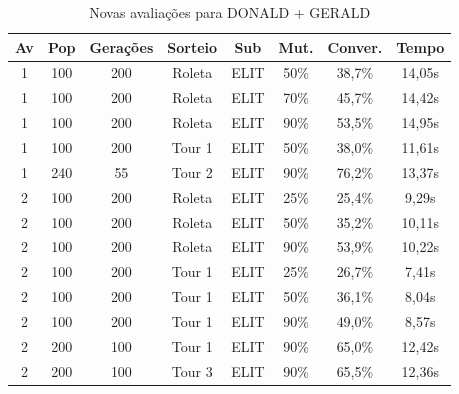 \documentclass[a4paper, 12pt]{article}
\begin{document}
  \begin{table}[h]
    \centering
    \begin{tabular}{|c|c|c|c|c|c|c|c|}
      \hline
      Av & Pop & Gerações & Sorteio & Sub & Mut. & Conver. & Tempo  \\
      \hline
      1 & 100 & 200 & Roleta & ELIT & 50\% &38,7\% & 14,05s\\
      \hline
      1 & 100 & 200 & Roleta & ELIT & 70\% &45,7\% & 14,42s\\
      \hline
      1 & 100 & 200 & Roleta & ELIT & 90\% &53,5\% & 14,95s\\
      \hline
      1 & 100 & 200 & Tour 1 & ELIT & 50\% &38,0\% & 11,61s\\
      \hline
      1 & 240 & 55 & Tour 2 & ELIT & 90\% &76,2\% & 13,37s\\
      \hline
      2 & 100 & 200 & Roleta & ELIT & 25\% &25,4\% & 9,29s\\
      \hline
      2 & 100 & 200 & Roleta & ELIT & 50\% &35,2\% & 10,11s\\
      \hline
      2 & 100 & 200 & Roleta & ELIT & 90\% &53,9\% & 10,22s\\
      \hline
      2 & 100 & 200 & Tour 1 & ELIT & 25\% &26,7\% & 7,41s\\
      \hline
      2 & 100 & 200 & Tour 1 & ELIT & 50\% &36,1\% & 8,04s\\
      \hline
      2 & 100 & 200 & Tour 1 & ELIT & 90\% &49,0\% & 8,57s\\
      \hline
      2 & 200 & 100 & Tour 1 & ELIT & 90\% &65,0\% & 12,42s\\
      \hline
      2 & 200 & 100 & Tour 3 & ELIT & 90\% &65,5\% & 12,36s\\
      \hline
    \end{tabular}
    \caption{Novas avaliações para DONALD + GERALD}
    \label{tab:donald}
  \end{table}
\end{document}
